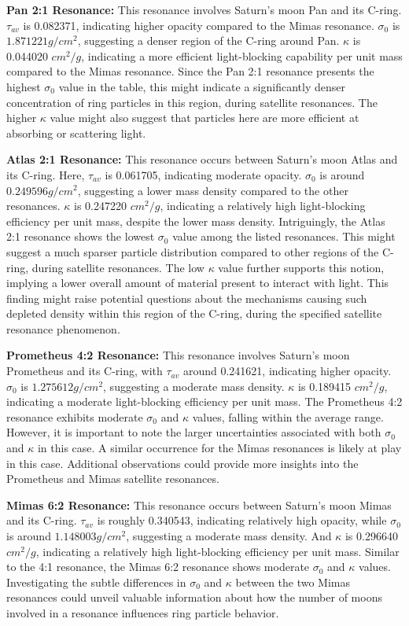 \documentclass{article}
\begin{document}
\textbf{Pan 2:1 Resonance:}
This resonance involves Saturn's moon Pan and its C-ring. $\tau_{av}$ is 0.082371, indicating higher opacity compared to the Mimas resonance. $\sigma_{0}$ is $1.871221 g/cm^{2}$, suggesting a denser region of the C-ring around Pan. $\kappa$ is 0.044020 $cm^{2}/g$, indicating a more efficient light-blocking capability per unit mass compared to the Mimas resonance. Since the Pan 2:1 resonance presents the highest $\sigma_{0}$ value in the table, this might indicate a significantly denser concentration of ring particles in this region, during satellite resonances. The higher $\kappa$ value might also suggest that particles here are more efficient at absorbing or scattering light.

\textbf{Atlas 2:1 Resonance:}
This resonance occurs between Saturn's moon Atlas and its C-ring. Here, $\tau_{av}$ is 0.061705, indicating moderate opacity. $\sigma_{0}$ is around $0.249596 g/cm^{2}$, suggesting a lower mass density compared to the other resonances. $\kappa$ is 0.247220 $cm^{2}/g$, indicating a relatively high light-blocking efficiency per unit mass, despite the lower mass density. Intriguingly, the Atlas 2:1 resonance shows the lowest $\sigma_{0}$ value among the listed resonances. This might suggest a much sparser particle distribution compared to other regions of the C-ring, during satellite resonances. The low $\kappa$ value further supports this notion, implying a lower overall amount of material present to interact with light. This finding might raise potential questions about the mechanisms causing such depleted density within this region of the C-ring, during the specified satellite resonance phenomenon.

\textbf{Prometheus 4:2 Resonance:}
This resonance involves Saturn's moon Prometheus and its C-ring, with $\tau_{av}$ around 0.241621, indicating higher opacity. $\sigma_{0}$ is $1.275612 g/cm^{2}$, suggesting a moderate mass density. $\kappa$ is 0.189415 $cm^{2}/g$, indicating a moderate light-blocking efficiency per unit mass. The Prometheus 4:2 resonance exhibits moderate $\sigma_{0}$ and $\kappa$ values, falling within the average range. However, it is important to note the larger uncertainties associated with both $\sigma_{0}$ and $\kappa$ in this case. A similar occurrence for the Mimas resonances is likely at play in this case. Additional observations could provide more insights into the Prometheus and Mimas satellite resonances.

\textbf{Mimas 6:2 Resonance:}
This resonance occurs between Saturn's moon Mimas and its C-ring. $\tau_{av}$ is roughly 0.340543, indicating relatively high opacity, while $\sigma_{0}$ is around $1.148003 g/cm^{2}$, suggesting a moderate mass density. And $\kappa$ is 0.296640 $cm^{2}/g$, indicating a relatively high light-blocking efficiency per unit mass. Similar to the 4:1 resonance, the Mimas 6:2 resonance shows moderate $\sigma_{0}$ and $\kappa$ values. Investigating the subtle differences in $\sigma_{0}$ and $\kappa$ between the two Mimas resonances could unveil valuable information about how the number of moons involved in a resonance influences ring particle behavior.
\end{document}
